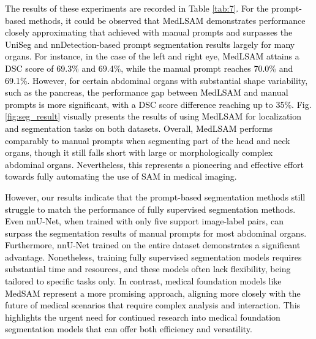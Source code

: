 \documentclass[times,twocolumn,final]{elsarticle}
\begin{document}
\par \textcolor{black}{The results of these experiments are recorded in Table \ref{tab:7}. For the prompt-based methods, it could be observed that MedLSAM demonstrates performance closely approximating that achieved with manual prompts and surpasses the UniSeg and nnDetection-based prompt segmentation results largely for many organs. For instance, in the case of the left and right eye, MedLSAM attains a DSC score of 69.3\% and 69.4\%, while the manual prompt reaches 70.0\% and 69.1\%. However, for certain abdominal organs with substantial shape variability, such as the pancreas, the performance gap between MedLSAM and manual prompts is more significant, with a DSC score difference reaching up to 35\%. Fig. \ref{fig:seg_result} visually presents the results of using MedLSAM for localization and segmentation tasks on both datasets. Overall, MedLSAM performs comparably to manual prompts when segmenting part of the head and neck organs, though it still falls short with large or morphologically complex abdominal organs. Nevertheless, this represents a pioneering and effective effort towards fully automating the use of SAM in medical imaging.}
\par \textcolor{black}{However, our results indicate that the prompt-based segmentation methods still struggle to match the performance of fully supervised segmentation methods. Even nnU-Net, when trained with only five support image-label pairs, can surpass the segmentation results of manual prompts for most abdominal organs. Furthermore, nnU-Net trained on the entire dataset demonstrates a significant advantage. Nonetheless, training fully supervised segmentation models requires substantial time and resources, and these models often lack flexibility, being tailored to specific tasks only. In contrast, medical foundation models like MedSAM represent a more promising approach, aligning more closely with the future of medical scenarios that require complex analysis and interaction\cite{zhang2023challenges,moor2023foundation}. This highlights the urgent need for continued research into medical foundation segmentation models that can offer both efficiency and versatility.}
\end{document}
